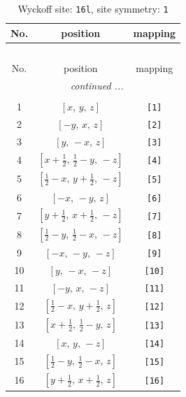 \documentclass[fleqn,8pt]{jsarticle}
\begin{document}
\begin{longtable}{ccc}
\caption{Wyckoff site: {\tt 16l}, site symmetry: {\tt 1}}
 \\
 \hline \hline
No. & position & mapping \\ \hline \endfirsthead

\multicolumn{2}{l}{\tablename\ \thetable{}} \\
 \hline \hline
No. & position & mapping \\ \hline \endhead

 \hline \hline
\multicolumn{2}{r}{\footnotesize\it continued ...} \\ \endfoot

 \hline \hline
\multicolumn{2}{r}{} \\ \endlastfoot

1 & $\left[ x,\, y,\, z \right]$ & {\tt [1]} \\ \hline
2 & $\left[ - y,\, x,\, z \right]$ & {\tt [2]} \\ \hline
3 & $\left[ y,\, - x,\, z \right]$ & {\tt [3]} \\ \hline
4 & $\left[ x + \frac{1}{2},\, \frac{1}{2} - y,\, - z \right]$ & {\tt [4]} \\ \hline
5 & $\left[ \frac{1}{2} - x,\, y + \frac{1}{2},\, - z \right]$ & {\tt [5]} \\ \hline
6 & $\left[ - x,\, - y,\, z \right]$ & {\tt [6]} \\ \hline
7 & $\left[ y + \frac{1}{2},\, x + \frac{1}{2},\, - z \right]$ & {\tt [7]} \\ \hline
8 & $\left[ \frac{1}{2} - y,\, \frac{1}{2} - x,\, - z \right]$ & {\tt [8]} \\ \hline
9 & $\left[ - x,\, - y,\, - z \right]$ & {\tt [9]} \\ \hline
10 & $\left[ y,\, - x,\, - z \right]$ & {\tt [10]} \\ \hline
11 & $\left[ - y,\, x,\, - z \right]$ & {\tt [11]} \\ \hline
12 & $\left[ \frac{1}{2} - x,\, y + \frac{1}{2},\, z \right]$ & {\tt [12]} \\ \hline
13 & $\left[ x + \frac{1}{2},\, \frac{1}{2} - y,\, z \right]$ & {\tt [13]} \\ \hline
14 & $\left[ x,\, y,\, - z \right]$ & {\tt [14]} \\ \hline
15 & $\left[ \frac{1}{2} - y,\, \frac{1}{2} - x,\, z \right]$ & {\tt [15]} \\ \hline
16 & $\left[ y + \frac{1}{2},\, x + \frac{1}{2},\, z \right]$ & {\tt [16]} \\
\end{longtable}
\end{document}
